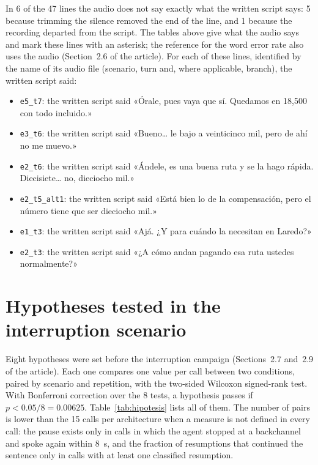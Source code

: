 \documentclass[11pt]{article}
\newcommand{\RGuionCorregidas}{6}
\newcommand{\RGuionCorregidasDesvio}{1}
\newcommand{\RGuionCorregidasRecorte}{5}
\newcommand{\RGuionLineas}{47}
\newcommand{\RIntLlamadasA}{15}
\newcommand{\RIntPruebaAlfa}{0.00625}
\newcommand{\RIntPruebaFamilia}{8}
\begin{document}
In \RGuionCorregidas{} of the \RGuionLineas{} lines the audio does not say exactly
what the written script says: \RGuionCorregidasRecorte{} because trimming the
silence removed the end of the line, and \RGuionCorregidasDesvio{} because the
recording departed from the script. The tables above give what the audio says and
mark these lines with an asterisk; the reference for the word error rate also uses
the audio (Section~2.6 of the article). For each of these lines, identified by the
name of its audio file (scenario, turn and, where applicable, branch), the written
script said:
{\footnotesize
\begin{itemize}[leftmargin=1.2cm,itemsep=0pt]
\item \texttt{e5\_t7}: the written script said «Órale, pues vaya que sí. Quedamos en 18,500 con todo incluido.»
\item \texttt{e3\_t6}: the written script said «Bueno… le bajo a veinticinco mil, pero de ahí no me muevo.»
\item \texttt{e2\_t6}: the written script said «Ándele, es una buena ruta y se la hago rápida. Diecisiete… no, dieciocho mil.»
\item \texttt{e2\_t5\_alt1}: the written script said «Está bien lo de la compensación, pero el número tiene que ser dieciocho mil.»
\item \texttt{e1\_t3}: the written script said «Ajá. ¿Y para cuándo la necesitan en Laredo?»
\item \texttt{e2\_t3}: the written script said «¿A cómo andan pagando esa ruta ustedes normalmente?»
\end{itemize}
}


\section{Hypotheses tested in the interruption scenario}
\label{sec:hipotesis}

Eight hypotheses were set before the interruption campaign (Sections~2.7 and~2.9 of
the article). Each one compares one value per call between two conditions, paired
by scenario and repetition, with the two-sided Wilcoxon signed-rank test. With
Bonferroni correction over the \RIntPruebaFamilia{} tests, a hypothesis passes if
$p<0.05/\RIntPruebaFamilia=\RIntPruebaAlfa$. Table~\ref{tab:hipotesis} lists all of
them. The number of pairs is lower than the \RIntLlamadasA{} calls per architecture
when a measure is not defined in every call: the pause exists only in calls in
which the agent stopped at a backchannel and spoke again within 8~s, and the
fraction of resumptions that continued the sentence only in calls with at least one
classified resumption.
\end{document}
